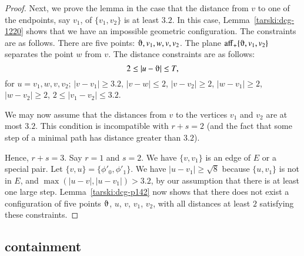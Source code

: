 \begin{proof}
Next, we prove the lemma in the case that the distance from
$v$ to one of the endpoints, say $v_1$, of $\{v_1,v_2\}$ is at least
$3.2$. In this case, Lemma~\ref{tarski:dcg-1220} shows
that we have an
impossible geometric configuration. The
constraints are as follows.  There are five points: $\orgn,v_1,w,v,v_2$.
The plane $\op{aff}_+\{\orgn,v_1,v_2\}$ separates the point $w$ from $v$. The
distance constraints are as follows:
    $$2\le |u-\orgn| \le T,$$
for $u=v_1,w,v,v_2$; $|v-v_1|\ge 3.2$, $|v-w|\le2$, $|v-v_2|\ge2$,
$|w-v_1|\ge2$, $|w-v_2|\ge2$, $2\le |v_1-v_2|\le 3.2$.

We may now assume that the distances from $v$ to the vertices $v_1$ and
$v_2$ are at most $3.2$.  This condition is incompatible with $r+s=2$
(and the fact that some step of a minimal path has distance greater than 
$3.2$).  

Hence, $r+s=3$.
Say $r=1$ and $s=2$. We have $\{v,v_1\}$ is
an edge of $E$ or a special pair.  Let
$\{v,u\}=\{\phi'_0,\phi'_1\}$. We
have $|u-v_1|\ge\sqrt8$ because $\{u,v_1\}$ is not in $E$,
and $\max(|u-v|,|u-v_1|)>3.2$, by our assumption that there is at least
one large step.  Lemma~\ref{tarski:dcg-p142} now shows that
there does not exist a configuration of five points
$\orgn$, $u$, $v$, $v_1$, $v_2$, with all distances at least $2$
satisfying these constraints.
\end{proof}



\subsection{containment} %

